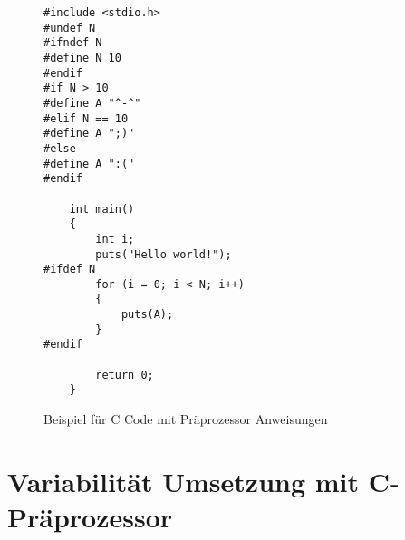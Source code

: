 
\lstset{escapechar=@,style=customc}
\begin{figure}[H]
\hspace*{3cm}
\begin{minipage}{\textwidth}
\begin{lstlisting}
#include <stdio.h>
#undef N
#ifndef N
#define N 10
#endif	
#if N > 10
#define A "^-^"
#elif N == 10
#define A ";)"
#else
#define A ":("
#endif
	
	int main()
	{
		int i;
		puts("Hello world!");
#ifdef N
		for (i = 0; i < N; i++)
		{
			puts(A);
		}
#endif
		
		return 0;
	}
\end{lstlisting}
\end{minipage}
%
\caption{Beispiel für C Code mit Präprozessor Anweisungen}
\end{figure}


\section{Variabilität Umsetzung mit C-Präprozessor}

